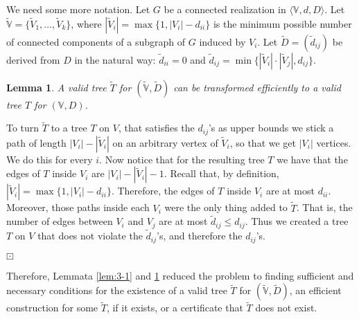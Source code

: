 \documentclass[12pt,a4paper]{article}
\theoremstyle{definition}
\theoremstyle{plain}
\newtheorem{lemma}[dfn]{Lemma}
\newenvironment{prf}{\noindent {\bf Proof.}}{\begin{flushright}\vspace{-2em}\footnotesize$\boxdot$\normalsize\end{flushright}\smallskip}
\begin{document}
We need some more notation.
Let $G$ be a connected realization in
$\langle{\mathbb V},d,D\rangle$.
Let $\widetilde{\mathbb V} \! =  \! \{ \widetilde{V}_{1},\ldots , \widetilde{V}_{k} \}$,
where $|\widetilde{V}_{i}| \! = \! \max \{ 1, |V_i| \! - \! d_{ii} \}$
is the minimum possible number of connected components of a subgraph of $G$
induced by $V_i$.
Let $\widetilde{D} \! = \! (\widetilde{d}_{ij})$
be derived from $D$ in the natural way:
$\widetilde{d}_{ii} \! = \! 0$ and
$\widetilde{d}_{{ij}} \! = \! \min \{ |\widetilde{V}_{i}|\cdot|\widetilde{V}_{j}| ,d_{ij} \}$.
\begin{lemma}
\label{lem:3-2}
A valid tree $\widetilde{T}$ for
$( \widetilde{\mathbb V}, \widetilde{D} )$
can be transformed efficiently to a valid tree $T$ for $({\mathbb V},D)$.
\end{lemma}
\begin{prf}
To turn $\widetilde{T}$ to a tree $T$ on
$V$, that satisfies the $d_{ij}$'s as upper bounds 
we stick a path of length $|V_i|-|\widetilde{V}_i|$
on an arbitrary vertex of $\widetilde{V}_i$, so that we get $|V_i|$
vertices. We do this for every $i$.
Now notice that for the resulting tree $T$ we have
that the edges of $T$ inside $V_i$ are 
$|V_i|-|\widetilde{V}_i| - 1$. Recall that,
by definition, $|\widetilde{V}_i|=\max\{1, |V_i|-d_{ii}\}$. Therefore,
the edges of $T$ inside $V_i$ are at most $d_{ii}$. 
Moreover,
those paths inside each $V_i$ were the only thing added to $\widetilde{T}$. 
That is, the number of edges between $V_i$ and $V_j$ are
at most
$\widetilde{d}_{ij}\leq d_{ij}$.
Thus we created a tree $T$ on $V$ that does not violate the
$\widetilde{d}_{ij}$'s, and therefore the $d_{ij}$'s.
\end{prf}


Therefore, Lemmata \ref{lem:3-1} and \ref{lem:3-2} reduced the problem 
to finding sufficient and necessary conditions for the existence
of a valid tree $\widetilde{T}$ for $(\widetilde{\mathbb V},\widetilde{D})$,
an efficient construction
for some $\widetilde{T}$, if it exists,
or a certificate that $\widetilde{T}$ does not exist.
\end{document}
